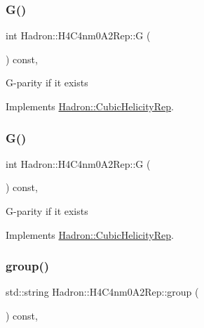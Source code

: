 \subsubsection{\texorpdfstring{G()}{G()}\hspace{0.1cm}{\footnotesize\ttfamily [1/2]}}
{\footnotesize\ttfamily int Hadron\+::\+H4\+C4nm0\+A2\+Rep\+::G (\begin{DoxyParamCaption}{ }\end{DoxyParamCaption}) const\hspace{0.3cm}{\ttfamily [inline]}, {\ttfamily [virtual]}}

G-\/parity if it exists 

Implements \mbox{\hyperlink{structHadron_1_1CubicHelicityRep_a50689f42be1e6170aa8cf6ad0597018b}{Hadron\+::\+Cubic\+Helicity\+Rep}}.

\mbox{\label{structHadron_1_1H4C4nm0A2Rep_a3e0953884b60350c510ec87f83956152}} 
\subsubsection{\texorpdfstring{G()}{G()}\hspace{0.1cm}{\footnotesize\ttfamily [2/2]}}
{\footnotesize\ttfamily int Hadron\+::\+H4\+C4nm0\+A2\+Rep\+::G (\begin{DoxyParamCaption}{ }\end{DoxyParamCaption}) const\hspace{0.3cm}{\ttfamily [inline]}, {\ttfamily [virtual]}}

G-\/parity if it exists 

Implements \mbox{\hyperlink{structHadron_1_1CubicHelicityRep_a50689f42be1e6170aa8cf6ad0597018b}{Hadron\+::\+Cubic\+Helicity\+Rep}}.

\mbox{\label{structHadron_1_1H4C4nm0A2Rep_a9424437b4e8f2230697222a77fe7b3e0}} 
\subsubsection{\texorpdfstring{group()}{group()}\hspace{0.1cm}{\footnotesize\ttfamily [1/3]}}
{\footnotesize\ttfamily std\+::string Hadron\+::\+H4\+C4nm0\+A2\+Rep\+::group (\begin{DoxyParamCaption}{ }\end{DoxyParamCaption}) const\hspace{0.3cm}{\ttfamily [inline]}, {\ttfamily [virtual]}}

